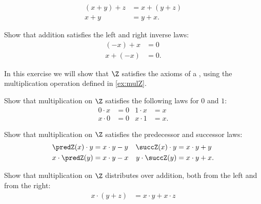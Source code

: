 \begin{exercises}
\begin{subexenum}
\begin{align*}
      (x+y)+z & = x + (y+z) \\
      x+y & = y+x.
    \end{align*}
  \item Show that addition satisfies the left and right inverse laws:
    \begin{align*}
      (-x)+x & =0 \\
      x+(-x) &=0.
    \end{align*}
  \end{subexenum}
  \exitem \label{ex:ring-Z}In this exercise we will show that $\Z$ satisfies the axioms of a , using the multiplication operation defined in \cref{ex:mulZ}.
  \begin{subexenum}
  \item Show that multiplication on $\Z$ satisfies the following laws for $0$ and $1$:
    \begin{align*}
      0\cdot x & = 0 & 1\cdot x & = x \\
      x\cdot 0 & = 0 & x\cdot 1 & = x.
    \end{align*}
  \item Show that multiplication on $\Z$ satisfies the predecessor and successor laws:
    \begin{align*}
      \predZ(x)\cdot y & = x\cdot y-y & \succZ(x)\cdot y & = x\cdot y + y \\
      x\cdot \predZ(y) & = x\cdot y-x & y\cdot \succZ(y) & = x\cdot y + x.
    \end{align*}
  \item Show that multiplication on $\Z$ distributes over addition, both from the left and from the right:
    \begin{align*}
      x\cdot(y+z) & = x\cdot y+ x\cdot z \\

\end{align*}
\end{subexenum}
\end{exercises}
